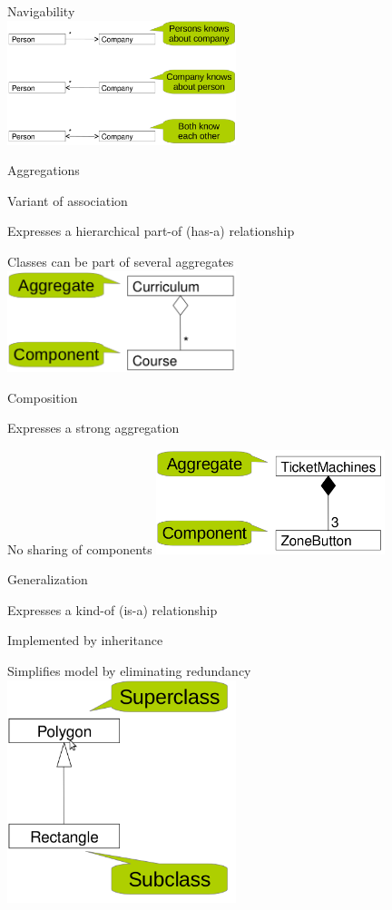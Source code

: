 	\item Navigability
	\\ \includegraphics[width=0.5\textwidth]{img/association_directed.png}
	
	\item Aggregations
	\enumstart
		\item Variant of association
		\item Expresses a hierarchical part-of (has-a) relationship
		\item Classes can be part of several aggregates
	\enumend
	\includegraphics[width=0.5\textwidth]{img/aggregation.png}

	\item Composition
	\enumstart
		\item Expresses a strong aggregation
		\item No sharing of components
	\enumend
	\includegraphics[width=0.5\textwidth]{img/composition.png}
	
	\item Generalization
	\enumstart
		\item Expresses a kind-of (is-a) relationship
		\item Implemented by inheritance
		\item Simplifies model by eliminating redundancy
	\enumend
	\includegraphics[width=0.5\textwidth]{img/generalization.png}
	
